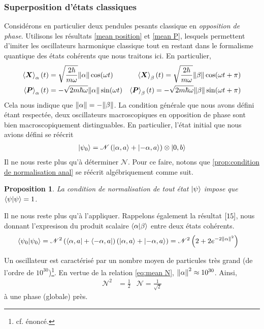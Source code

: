 \documentclass[11pt,oneside,a4paper]{article}
\newcommand{\h}{\ensuremath{\hbar}}
\newtheorem{property}[theorem]{Proposition}
\begin{document}
\subsubsection{Superposition d'états classiques}
Considérons en particulier deux pendules pesants classique en \emph{opposition de phase}. Utilisons les résultats \eqref{mean position} et \eqref{mean P}, lesquels permettent d'imiter les oscillateurs harmonique classique tout en restant dans le formalisme quantique des états cohérents que nous traitons ici. En particulier,
\begin{align*}
  \expval{\bm{X}}_\alpha (t) &= \sqrt{\frac{2\h}{m\omega}}\norm{\alpha}\cos(\omega t) &\expval{\bm{X}}_\beta (t) = \sqrt{\frac{2\h}{m\omega}}\norm{\beta}\cos(\omega t+\pi)\\
  \expval{\bm{P}}_\alpha (t) &= -\sqrt{2m\h\omega}\norm{\alpha}\sin(\omega t) &\expval{\bm{P}}_\beta (t) = -\sqrt{2m\h\omega}\norm{\beta}\sin(\omega t+\pi)
\end{align*}
Cela nous indique que $\norm{\alpha} = -\norm{\beta}$. La condition générale que nous avons défini étant respectée, deux oscillateurs macroscopiques en opposition de phase sont bien macroscopiquement distinguables. En particulier, l'état initial que nous avions défini se réécrit
\begin{align*}
  \ket{\psi_0} = \mathcal{N}\left(\ket{\alpha,a}+\ket{-\alpha,a}\right)\otimes\ket{0,b}
\end{align*}
Il ne nous reste plus qu'à déterminer $\mathcal{N}$. Pour ce faire, notons que \ref{prop:condition de normalisation anal} se réécrit algébriquement comme suit.
\begin{property}
  La condition de normalisation de tout état $\ket{\psi}$ impose que $\braket{\psi} = 1$.
\end{property}

Il ne nous reste plus qu'à l'appliquer. Rappelons également la résultat $\eqref{15}$, nous donnant l'expresison du produit scalaire $\braket{\alpha}{\beta}$ entre deux états cohérents.
\begin{align*}
  \braket{\psi_0} &= \mathcal{N}^2\left(\bra{\alpha,a}+\bra{-\alpha,a}\right)\left(\ket{\alpha,a}+\ket{-\alpha,a}\right) = \mathcal{N}^2\left(2+2e^{-2\norm{\alpha}^2}\right)
\end{align*}

Un oscillateur est caractérisé par un nombre moyen de particules très grand (de l'ordre de $10^{30}$)\footnote{cf. énoncé.}. En vertue de la relation \eqref{eq:mean N}, $\norm{\alpha}^2 \approx 10^{30}$. Ainsi, 
\begin{align}
  \mathcal{N}^2 &= \frac{1}{2} &\mathcal{N} = \frac{1}{\sqrt{2}}
\end{align} 
à une phase (globale) près.
\end{document}
